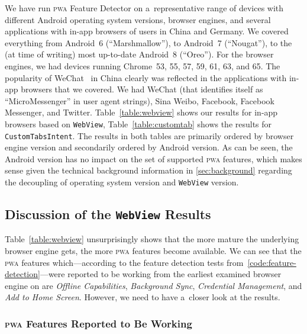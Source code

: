 \documentclass[sigconf]{acmart}
\begin{document}
We have run \textsc{pwa} Feature Detector on a~representative range of devices
with different Android operating system versions, browser engines,
and several applications with in-app browsers of users in China and Germany.
We covered everything from Android~6 (``Marshmallow''),
to Android~7 (``Nougat''),
to the (at time of writing) most up-to-date Android~8 (``Oreo''). 
For the browser engines, we had devices running Chrome~53, 55, 57, 59, 61, 63, and 65.
The popularity of WeChat~\cite{chan2015wechat} in China clearly was reflected 
in the applications with in-app browsers that we covered.
We had WeChat (that identifies itself as ``MicroMessenger'' in user agent strings),
Sina Weibo, Facebook, Facebook Messenger, and Twitter.
Table~\ref{table:webview} shows our results for in-app browsers based on
\texttt{WebView}, Table~\ref{table:customtab} shows the results for
\texttt{CustomTabsIntent}.
The results in both tables are primarily ordered by browser engine version
and secondarily ordered by Android version.
As can be seen, the Android version has no impact
on the set of supported \textsc{pwa} features,
which makes sense given the technical background information
in \autoref{sec:background} regarding the decoupling of operating system version
and \texttt{WebView} version.

\subsection{Discussion of the \texttt{WebView} Results}

Table~\ref{table:webview} unsurprisingly shows that the more mature
the underlying browser engine gets, the more \textsc{pwa} features become available.
We can see that the \textsc{pwa} features which---according to the feature detection tests
from~\autoref{code:feature-detection}---were reported to be working
from the earliest examined browser engine on are \emph{Offline Capabilities},
\emph{Background Sync}, \emph{Credential Management}, and \emph{Add to Home Screen}.
However, we need to have a~closer look at the results.

\subsubsection{\textsc{pwa} Features Reported to Be Working}
\end{document}
